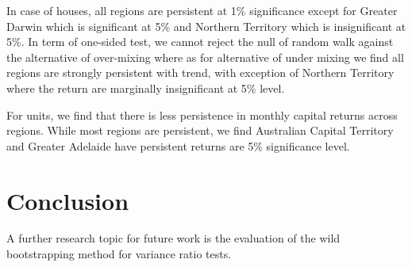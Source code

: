 \documentclass[AEJ,reqno, draftmode]{AEA}
\begin{document}
In case of houses, all regions are persistent at 1\% significance except for Greater Darwin which is significant at 5\% and Northern Territory which is insignificant at 5\%. In term of one-sided test, we cannot reject the null of random walk against the alternative of over-mixing where as for alternative of under mixing we find all regions are strongly persistent with trend, with exception of Northern Territory where the return are marginally insignificant at 5\% level.

For units, we find that there is less persistence in monthly capital returns across regions. While most regions are persistent, we find Australian Capital Territory and Greater Adelaide have persistent returns are 5\% significance level. 



\restoregeometry


\restoregeometry


\restoregeometry


\restoregeometry



\section{Conclusion}


A further research topic for future work is the evaluation of the wild bootstrapping method for variance ratio tests.
\end{document}
